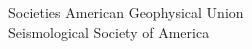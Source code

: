\begin{rSection}{Societies}
    American Geophysical Union \\
    Seismological Society of America
\end{rSection}